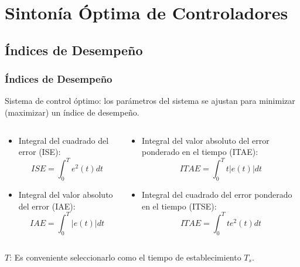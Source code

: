 \documentclass[aspectratio=169]{beamer}
\theoremstyle{definition}
\theoremstyle{plain}
\theoremstyle{remark}
\begin{document}
\section{Sintonía Óptima de Controladores}
\subsection{Índices de Desempeño}
\begin{frame}[<+->]\frametitle{Índices de Desempeño}
	Sistema de control óptimo: los parámetros del sistema se ajustan para minimizar (maximizar) un índice de desempeño.
	\begin{columns}
	\begin{column}{0.5\textwidth}
	\begin{itemize}
		\item Integral del cuadrado del error (ISE):
		\begin{equation*}
			ISE = \int_0^T e^2(t) dt
		\end{equation*}
		\item Integral del valor absoluto del error (IAE):
		\begin{equation*}
			IAE = \int_0^T |e(t)| dt
		\end{equation*}
	\end{itemize}
	\end{column}	
	\begin{column}{0.5\textwidth}
	\begin{itemize}
		\item Integral del valor absoluto del error ponderado en el tiempo (ITAE):
		\begin{equation*}
			ITAE = \int_0^T t |e(t)| dt
		\end{equation*}
		\item Integral del cuadrado del error ponderado en el tiempo (ITSE):
		\begin{equation*}
			ITAE = \int_0^T t e^2(t) dt
		\end{equation*}
	\end{itemize}
	\end{column}	
	\end{columns}
	\vspace*{-5mm}
	$T$: Es conveniente seleccionarlo como el tiempo de establecimiento $T_s$.
\end{frame}
\end{document}
